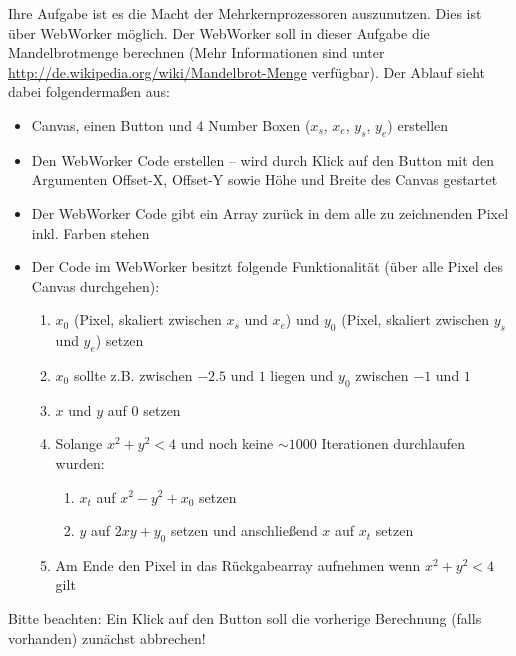 %
\par Ihre Aufgabe ist es die Macht der Mehrkernprozessoren auszunutzen. Dies ist über WebWorker möglich. Der WebWorker soll in dieser Aufgabe die Mandelbrotmenge berechnen (Mehr Informationen sind unter \url{http://de.wikipedia.org/wiki/Mandelbrot-Menge} verfügbar). Der Ablauf sieht dabei folgendermaßen aus:
%
\begin{itemize}
\item Canvas, einen Button und $4$ Number Boxen ($x_s$, $x_e$, $y_s$, $y_e$) erstellen
\item Den WebWorker Code erstellen – wird durch Klick auf den Button mit den Argumenten Offset-X, Offset-Y sowie Höhe und Breite des Canvas gestartet
\item Der WebWorker Code gibt ein Array zurück in dem alle zu zeichnenden Pixel inkl. Farben stehen
\item Der Code im WebWorker besitzt folgende Funktionalität (über alle Pixel des Canvas durchgehen):
%
	\begin{enumerate}
	\item $x_0$ (Pixel, skaliert zwischen $x_s$ und $x_e$) und $y_0$ (Pixel, skaliert zwischen $y_s$ und $y_e$) setzen
	\item $x_0$ sollte z.B. zwischen $-2.5$ und $1$ liegen und $y_0$ zwischen $-1$ und $1$
	\item $x$ und $y$ auf $0$ setzen
	\item Solange $x^2 + y^2 < 4$ und noch keine $\sim 1000$ Iterationen durchlaufen wurden:
%
		\begin{enumerate}
		\item $x_t$ auf $x^2 - y^2 + x_0$ setzen
		\item $y$ auf $2xy + y_0$ setzen und anschließend $x$ auf $x_t$ setzen
		\end{enumerate}
%
	\item Am Ende den Pixel in das Rückgabearray aufnehmen wenn $x^2 + y^2 < 4$ gilt
	\end{enumerate}
%
\end{itemize}
%
\par Bitte beachten: Ein Klick auf den Button soll die vorherige Berechnung (falls vorhanden) zunächst abbrechen!